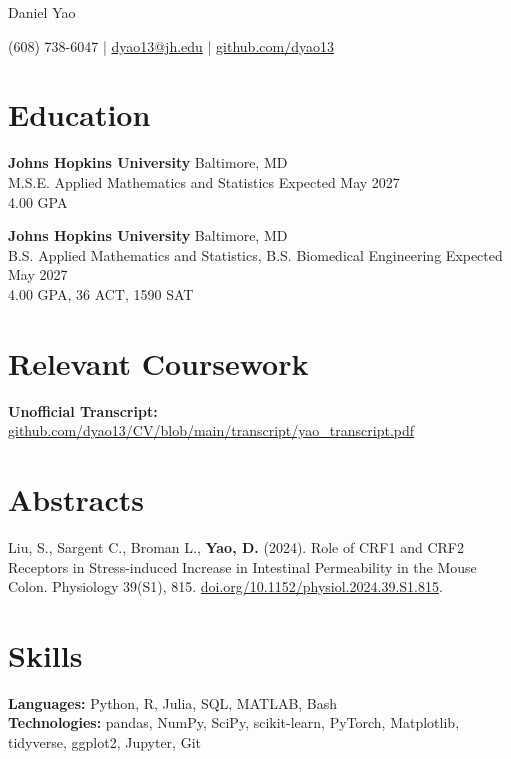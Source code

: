 \documentclass[11pt]{article}       %
\begin{document}
\centerline{\Huge Daniel Yao}

\vspace{5pt}

\centerline{(608) 738-6047 | \href{mailto:dyao13@jh.edu}{dyao13@jh.edu} | \href{https://github.com/dyao13/}{github.com/dyao13}}

\vspace{-9pt}

\section*{Education}
\textbf{Johns Hopkins University} \hfill Baltimore, MD \\
M.S.E. Applied Mathematics and Statistics \hfill Expected May 2027 \\
4.00 GPA

\vspace{5pt}

\textbf{Johns Hopkins University} \hfill Baltimore, MD \\
B.S. Applied Mathematics and Statistics, B.S. Biomedical Engineering \hfill Expected May 2027 \\
4.00 GPA, 36 ACT, 1590 SAT

\vspace{-9pt}

\section*{Relevant Coursework}
\textbf{Unofficial Transcript:} \href{https://github.com/dyao13/CV/blob/main/transcript/yao_transcript.pdf}{github.com/dyao13/CV/blob/main/transcript/yao\_transcript.pdf}

\vspace{-9pt}

\section*{Abstracts}
Liu, S., Sargent C., Broman L., \textbf{Yao, D.} (2024). Role of CRF1 and CRF2 Receptors in Stress-induced Increase in Intestinal Permeability in the Mouse Colon. Physiology 39(S1), 815. \href{https://doi.org/10.1152/physiol.2024.39.S1.815}{doi.org/10.1152/physiol.2024.39.S1.815}.

\vspace{-9pt}

\section*{Skills}
\textbf{Languages:} Python, R, Julia, SQL, MATLAB, Bash \\
\textbf{Technologies:} pandas, NumPy, SciPy, scikit-learn, PyTorch, Matplotlib, tidyverse, ggplot2, Jupyter, Git
\end{document}
